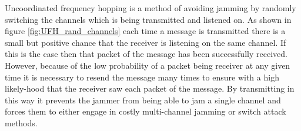 \documentclass[sigconf]{acmart}
\begin{document}
Uncoordinated frequency hopping is a method of avoiding jamming by randomly switching the channels which is being transmitted and listened on. As shown in figure \ref{fig:UFH_rand_channels} each time a message is transmitted there is a small but positive chance that the receiver is listening on the same channel. If this is the case then that packet of the message has been successfully received. However, because of the low probability of a packet being receiver at any given time it is necessary to resend the message many times to ensure with a high likely-hood that the receiver saw each packet of the message. By transmitting in this way it prevents the jammer from being able to jam a single channel and forces them to either engage in costly multi-channel jamming or switch attack methods. 

\begin{figure}[ht]
    \centering

    
\end{figure}
\end{document}
